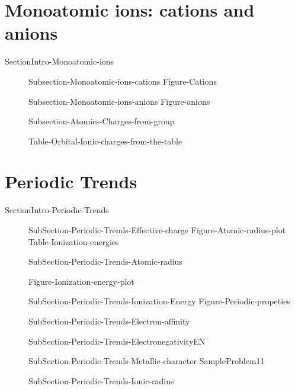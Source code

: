 \documentclass[main.tex]{subfiles}
\newcommand\chapterlabel{Ch-radiation}\setcounter{figurenewcounter}{0}\setcounter{tablenewcounter}{0}\setcounter{formulanewcounter}{0}\chapterpicture{../{\chapterlabel}/figure1}\chapterpicturelabel{PngImg}
\begin{document}
\section{Monoatomic ions: cations and anions}{SectionIntro-Monoatomic-ions}
\sloppy\begin{description}
\item[]{Subsection-Monoatomic-ions-cations}
{Figure-Cations}
\item[]{Subsection-Monoatomic-ions-anions}
{Figure-anions}
\item[]{Subsection-Atomics-Charges-from-group}

{Table-Orbital-Ionic-charges-from-the-table}

\end{description}
\newpage



\section{Periodic Trends}{SectionIntro-Periodic-Trends}
\vspace{0cm}{Figure-Atomic-radius}

\sloppy\begin{description}
\item[] {SubSection-Periodic-Trends-Effective-charge}
{Figure-Atomic-radius-plot}
{Table-Ionization-energies}

\item[] {SubSection-Periodic-Trends-Atomic-radius}

{Figure-Ionization-energy-plot}
\item[] {SubSection-Periodic-Trends-Ionization-Energy}
{Figure-Periodic-propeties}
\item[] {SubSection-Periodic-Trends-Electron-affinity}
\item[] {SubSection-Periodic-Trends-ElectronegativityEN}
\item[]{SubSection-Periodic-Trends-Metallic-character}
{SampleProblem11}
\item[]  {SubSection-Periodic-Trends-Ionic-radius}
\end{description}
\end{document}
